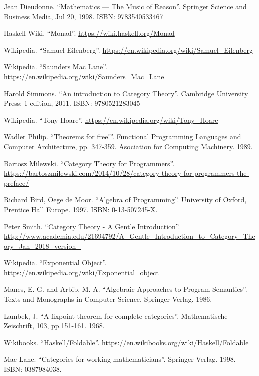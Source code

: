 \documentclass{article}
\begin{document}
\ifx\wholebook\relax \else
\begin{thebibliography}{99}

Jean Dieudonne. ``Mathematics — The Music of Reason''. Springer Science and Business Media, Jul 20, 1998. ISBN: 9783540533467

Haskell Wiki. ``Monad''. \url{https://wiki.haskell.org/Monad}

Wikipedia. ``Samuel Eilenberg''. \url{https://en.wikipedia.org/wiki/Samuel_Eilenberg}

Wikipedia. ``Saunders Mac Lane''. \url{https://en.wikipedia.org/wiki/Saunders_Mac_Lane}

Harold Simmons. ``An introduction to Category Theory''.  Cambridge University Press; 1 edition, 2011. ISBN: 9780521283045

Wikipedia. ``Tony Hoare''. \url{https://en.wikipedia.org/wiki/Tony_Hoare}

Wadler Philip. ``Theorems for free!''. Functional Programming Languages and Computer Architecture, pp. 347-359. Asociation for Computing Machinery. 1989.

Bartosz Milewski. ``Category Theory for Programmers''. \url{https://bartoszmilewski.com/2014/10/28/category-theory-for-programmers-the-preface/}

Richard Bird, Oege de Moor. ``Algebra of Programming''. University of Oxford, Prentice Hall Europe. 1997. ISBN: 0-13-507245-X.

Peter Smith. ``Category Theory - A Gentle Introduction''. \url{http://www.academia.edu/21694792/A_Gentle_Introduction_to_Category_Theory_Jan_2018_version_}

Wikipedia. ``Exponential Object''. \url{https://en.wikipedia.org/wiki/Exponential_object}

Manes, E. G. and Arbib, M. A. ``Algebraic Approaches to Program Semantics''. Texts and Monographs in Computer Science. Springer-Verlag. 1986.

Lambek, J. ``A fixpoint theorem for complete categories''. Mathematische Zeischrift, 103, pp.151-161. 1968.

Wikibooks. ``Haskell/Foldable''.  \url{https://en.wikibooks.org/wiki/Haskell/Foldable}

Mac Lane. ``Categories for working mathematicians''. Springer-Verlag. 1998. ISBN: 0387984038.

\end{thebibliography}

\expandafter\enddocument

\fi
\end{document}
